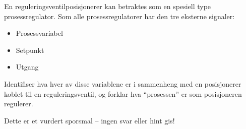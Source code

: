 

En reguleringsventilposisjonerer kan betraktes som en spesiell type prosessregulator.  Som alle prosessregulatorer har den tre eksterne signaler:

\begin{itemize}
\item{} Prosessvariabel
\item{} Setpunkt
\item{} Utgang
\end{itemize}

Identifiser hva hver av disse variablene er i sammenheng med en posisjonerer koblet til en reguleringsventil, og forklar hva ``prosessen'' er som posisjoneren regulerer.

\vfil

\eject






Dette er et vurdert sporsmal -- ingen svar eller hint gis!












